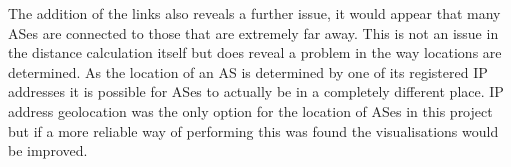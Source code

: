 The addition of the links also reveals a further issue, it would appear that many ASes are connected to those that are extremely far away. This is not an issue in the distance calculation itself but does reveal a problem in the way locations are determined. As the location of an AS is determined by one of its registered IP addresses it is possible for ASes to actually be in a completely different place. IP address geolocation was the only option for the location of ASes in this project but if a more reliable way of performing this was found the visualisations would be improved. 

